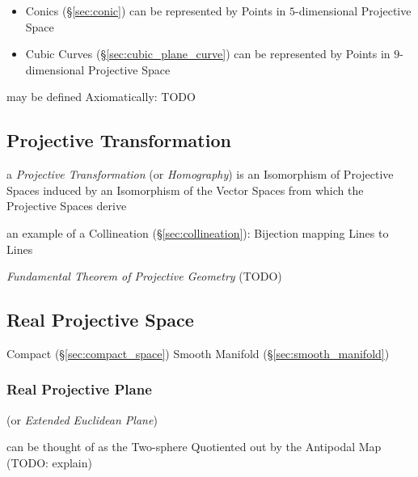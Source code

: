 \begin{itemize}
  \item Conics (\S\ref{sec:conic}) can be represented by Points in
    $5$-dimensional Projective Space
  \item Cubic Curves (\S\ref{sec:cubic_plane_curve}) can be represented by
    Points in $9$-dimensional Projective Space
\end{itemize}

may be defined Axiomatically: TODO



\subsection{Projective Transformation}\label{sec:projective_transformation}

a \emph{Projective Transformation} (or \emph{Homography}) is an Isomorphism of
Projective Spaces induced by an Isomorphism of the Vector Spaces from which the
Projective Spaces derive

an example of a Collineation (\S\ref{sec:collineation}): Bijection mapping Lines
to Lines

\emph{Fundamental Theorem of Projective Geometry} (TODO)



\subsection{Real Projective Space}\label{sec:real_projective_space}

Compact (\S\ref{sec:compact_space}) Smooth Manifold
(\S\ref{sec:smooth_manifold})



\subsubsection{Real Projective Plane}\label{sec:real_projective_plane}

(or \emph{Extended Euclidean Plane})

can be thought of as the Two-sphere Quotiented out by the Antipodal Map (TODO:
explain)



